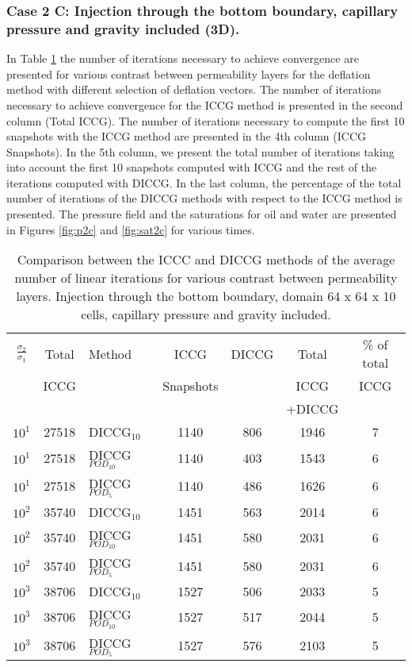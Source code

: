 \documentclass[12pt]{article}
\begin{document}
\subsubsection*{Case 2 C: Injection through the bottom boundary, capillary pressure and gravity included (3D).}
In Table \ref{table:liter2c} the number of iterations necessary to achieve convergence are presented for various contrast between permeability layers for the deflation method with different selection of deflation vectors. The number of iterations necessary to achieve convergence for the ICCG method is presented in the second column (Total ICCG). The number of iterations necessary to compute the first 10 snapshots with the ICCG method are presented in the 4th column (ICCG Snapshots). In the 5th column, we present the total number of iterations taking into account the first 10 snapshots computed with ICCG and the rest of the iterations computed with DICCG. In the last column, the percentage of the total number of iterations of the DICCG methods with respect to the ICCG method is presented.   
The pressure field and the saturations for oil and water are presented in Figures \ref{fig:p2c} and \ref{fig:sat2c} for various times.
\begin{table}[!h]\centering
\begin{minipage}{1\textwidth}
 \centering
\begin{tabular}{ ||c|c||l|c|c|c|c||} 
\hline
$\frac{\sigma_2}{\sigma_1}$&Total&Method  & ICCG&DICCG &Total&\% of total\\ 
                           & ICCG     &  & Snapshots& &ICCG& ICCG\\ 
                            &     &  & & &+DICCG& \\
\hline 
$10^{1}$ &27518& DICCG$_{10}$&1140&806&1946&7\\ 
\hline  
$10^{1}$ &27518& DICCG$_{POD_{10}}$&1140&403&1543&6 \\ 
\hline  
$10^{1}$ &27518& DICCG$_{POD_{5}}$&1140&486&1626&6 \\ 
\hline  
$10^{2}$ &35740& DICCG$_{10}$&1451&563&2014&6\\ 
\hline  
$10^{2}$ &35740& DICCG$_{POD_{10}}$&1451&580&2031&6 \\ 
\hline  
$10^{2}$ &35740& DICCG$_{POD_{5}}$&1451&580&2031&6 \\ 
\hline
$10^{3}$ &38706& DICCG$_{10}$&1527&506&2033&5\\ 
\hline  
$10^{3}$ &38706& DICCG$_{POD_{10}}$&1527&517&2044&5 \\ 
\hline  
$10^{3}$ &38706& DICCG$_{POD_{5}}$&1527&576&2103&5 \\ 
\hline  
\end{tabular} 
\caption{Comparison between the ICCC and DICCG methods of the average number of linear iterations for various contrast between permeability layers. Injection through the bottom boundary, domain 64 x 64 x 10 cells, capillary pressure and gravity included.}\label{table:liter2c} 
\end{minipage}  
\end{table}  
\end{document}
